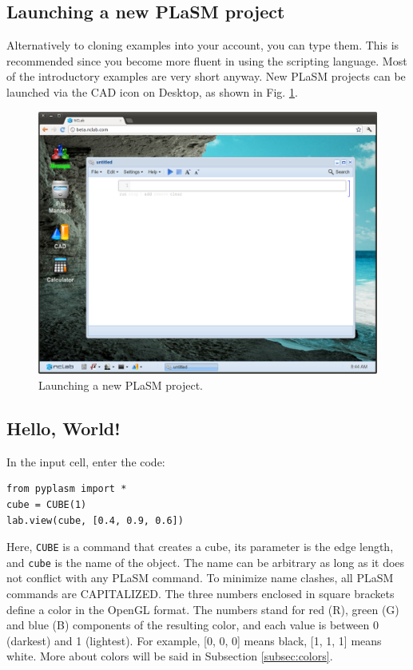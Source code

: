 \documentclass{article}
\begin{document}
\subsection{Launching a new PLaSM project}

Alternatively to cloning examples into your account, you can type them. This is 
recommended since you become more fluent in using the scripting language. 
Most of the introductory examples are very short anyway. New PLaSM projects 
can be launched via the CAD icon on Desktop, as shown in Fig. \ref{fig:python}.
\newpage

\begin{figure}[!ht]
\begin{center}
\includegraphics[width=\textwidth]{img/python.png}
\end{center}
\caption{Launching a new PLaSM project.}
\label{fig:python}
\end{figure}
\noindent

\subsection{Hello, World!}

In the input cell, enter the code:

\begin{verbatim}
from pyplasm import *
cube = CUBE(1)
lab.view(cube, [0.4, 0.9, 0.6])
\end{verbatim}
Here, {\tt CUBE} is a command that creates a cube, its parameter is the edge length,
and {\tt cube} is the name of the object.
The name can be arbitrary as long as it does not conflict with any PLaSM command. 
To minimize name clashes, all PLaSM commands are CAPITALIZED.
The three numbers enclosed in square brackets define a color in the 
OpenGL format. The numbers stand for red (R), green (G) and blue (B) 
components of the resulting color, and each value is between 0 (darkest) and 
1 (lightest). For example, [0, 0, 0] means black, [1, 1, 1] means white. 
More about colors will be said in Subsection \ref{subsec:colors}.
\end{document}
